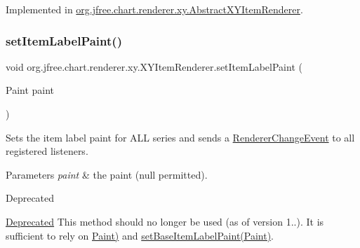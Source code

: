 Implemented in \mbox{\hyperlink{classorg_1_1jfree_1_1chart_1_1renderer_1_1xy_1_1_abstract_x_y_item_renderer_add7aa14845378a40b6db6159200cbab1}{org.\+jfree.\+chart.\+renderer.\+xy.\+Abstract\+X\+Y\+Item\+Renderer}}.

\mbox{\label{interfaceorg_1_1jfree_1_1chart_1_1renderer_1_1xy_1_1_x_y_item_renderer_aa7abb5be9a3273424f94b7ed2308b9ca}} 
\subsubsection{\texorpdfstring{set\+Item\+Label\+Paint()}{setItemLabelPaint()}}
{\footnotesize\ttfamily void org.\+jfree.\+chart.\+renderer.\+xy.\+X\+Y\+Item\+Renderer.\+set\+Item\+Label\+Paint (\begin{DoxyParamCaption}\item[{Paint}]{paint }\end{DoxyParamCaption})}

Sets the item label paint for A\+LL series and sends a \mbox{\hyperlink{}{Renderer\+Change\+Event}} to all registered listeners.


\begin{DoxyParams}{Parameters}
{\em paint} & the paint ({\ttfamily null} permitted).\\
\hline
\end{DoxyParams}
\begin{DoxyRefDesc}{Deprecated}
\item[\mbox{\hyperlink{deprecated__deprecated000232}{Deprecated}}]This method should no longer be used (as of version 1..). It is sufficient to rely on \mbox{\hyperlink{}{Paint)}} and \mbox{\hyperlink{interfaceorg_1_1jfree_1_1chart_1_1renderer_1_1xy_1_1_x_y_item_renderer_aa1ba3f77c7f073a7214dc7ff3e42536e}{set\+Base\+Item\+Label\+Paint(\+Paint)}}. \end{DoxyRefDesc}
\mbox{\label{interfaceorg_1_1jfree_1_1chart_1_1renderer_1_1xy_1_1_x_y_item_renderer_a9805685b3c5802635d141addf290fc25}} 
